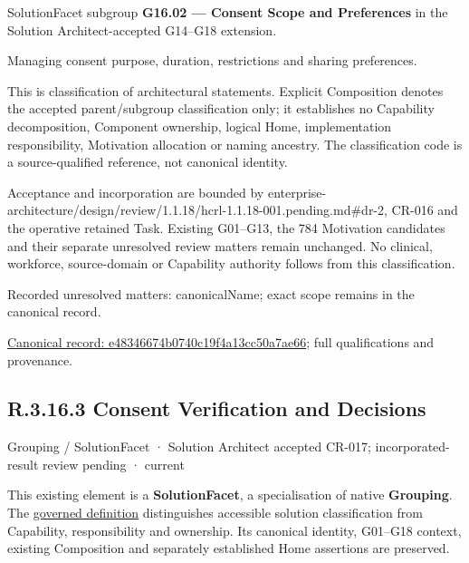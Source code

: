 SolutionFacet subgroup \textbf{G16.02 — Consent Scope and Preferences} in the Solution Architect-accepted G14–G18 extension.



Managing consent purpose, duration, restrictions and sharing preferences.



This is classification of architectural statements. Explicit Composition denotes the accepted parent/subgroup classification only; it establishes no Capability decomposition, Component ownership, logical Home, implementation responsibility, Motivation allocation or naming ancestry. The classification code is a source-qualified reference, not canonical identity.



Acceptance and incorporation are bounded by enterprise-architecture/design/review/1.1.18/hcrl-1.1.18-001.pending.md\#dr-2, CR-016 and the operative retained Task. Existing G01–G13, the 784 Motivation candidates and their separate unresolved review matters remain unchanged. No clinical, workforce, source-domain or Capability authority follows from this classification.


{\small Recorded unresolved matters: canonicalName; exact scope remains in the canonical record.}\par
{\footnotesize \href{../../../../../../../continuum/grouping/e48346674b0740c19f4a13cc50a7ae66.md}{Canonical record: e48346674b0740c19f4a13cc50a7ae66}; full qualifications and provenance.}\par
\subsection*{R.3.16.3 Consent Verification and Decisions}
\label{navigation:R.3.16.3}

\label{element:3d87dbf35e0a43a3b5e12cbc6b947763}
{\small Grouping / SolutionFacet · Solution Architect accepted CR-017; incorporated-result review pending · current}\par

This existing element is a \textbf{SolutionFacet}, a specialisation of native
\textbf{Grouping}. The \href{\detokenize{../../../../../../../governance/continuum-representation.md#solutionfacet-classification--1119-candidate}}{governed definition}
distinguishes accessible solution classification from Capability, responsibility
and ownership. Its canonical identity, G01–G18 context, existing Composition
and separately established Home assertions are preserved.



